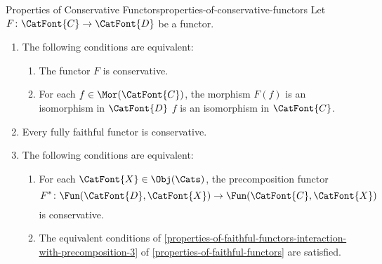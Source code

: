 \begin{proposition}{Properties of Conservative Functors}{properties-of-conservative-functors}%
    Let $F\colon\CatFont{C}\to\CatFont{D}$ be a functor.
    \begin{enumerate}
        \item\label{properties-of-conservative-functors-characterisations}The following conditions are equivalent:
            \begin{enumerate}
                \item\label{properties-of-conservative-functors-characterisations-a}The functor $F$ is conservative.
                \item\label{properties-of-conservative-functors-characterisations-b}For each $f\in\Mor(\CatFont{C})$, the morphism $F(f)$ is an isomorphism in $\CatFont{D}$ \textiff $f$ is an isomorphism in $\CatFont{C}$.%
            \end{enumerate}
        \item\label{properties-of-conservative-functors-interaction-with-fully-faithfulness}Every fully faithful functor is conservative.
        \item\label{properties-of-conservative-functors-interaction-with-precomposition}The following conditions are equivalent:
            \begin{enumerate}
                \item\label{properties-of-conservative-functors-interaction-with-precomposition-3-a}For each $\CatFont{X}\in\Obj(\Cats)$, the precomposition functor
                    \[
                        F^{*}
                        \colon
                        \Fun(\CatFont{D},\CatFont{X})
                        \to
                        \Fun(\CatFont{C},\CatFont{X})
                    \]%
                    is conservative.
                \item\label{properties-of-conservative-functors-interaction-with-precomposition-3-b}The equivalent conditions of \cref{properties-of-faithful-functors-interaction-with-precomposition-3} of \cref{properties-of-faithful-functors} are satisfied.
            \end{enumerate}
    \end{enumerate}
\end{proposition}
